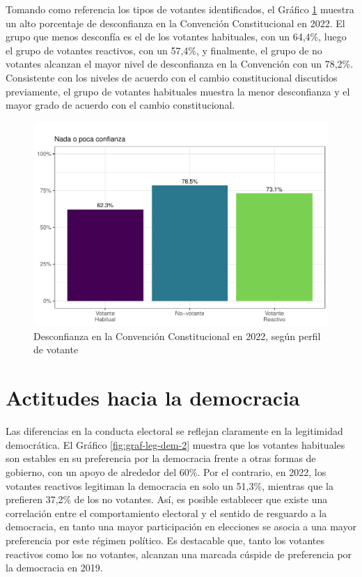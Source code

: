 \documentclass[
  12pt,
]{book}
\begin{document}
Tomando como referencia los tipos de votantes identificados, el Gráfico \ref{fig:graf-convencion-2} muestra un alto porcentaje de desconfianza en la Convención Constitucional en 2022. El grupo que menos desconfía es el de los votantes habituales, con un 64,4\%, luego el grupo de votantes reactivos, con un 57,4\%, y finalmente, el grupo de no votantes alcanzan el mayor nivel de desconfianza en la Convención con un 78,2\%. Consistente con los niveles de acuerdo con el cambio constitucional discutidos previamente, el grupo de votantes habituales muestra la menor desconfianza y el mayor grado de acuerdo con el cambio constitucional.

\begin{figure}

{\centering \includegraphics{reporte-elsoc_files/figure-latex/graf-convencion-2-1} 

}

\caption{Desconfianza en la Convención Constitucional en 2022, según perfil de votante}\label{fig:graf-convencion-2}
\end{figure}

\hypertarget{actitudes-hacia-la-democracia}{%
\section{Actitudes hacia la democracia}\label{actitudes-hacia-la-democracia}}

Las diferencias en la conducta electoral se reflejan claramente en la legitimidad democrática. El Gráfico \ref{fig:graf-leg-dem-2} muestra que los votantes habituales son estables en su preferencia por la democracia frente a otras formas de gobierno, con un apoyo de alrededor del 60\%. Por el contrario, en 2022, los votantes reactivos legitiman la democracia en solo un 51,3\%, mientras que la prefieren 37,2\% de los no votantes. Así, es posible establecer que existe una correlación entre el comportamiento electoral y el sentido de resguardo a la democracia, en tanto una mayor participación en elecciones se asocia a una mayor preferencia por este régimen político. Es destacable que, tanto los votantes reactivos como los no votantes, alcanzan una marcada cúspide de preferencia por la democracia en 2019.
\end{document}
